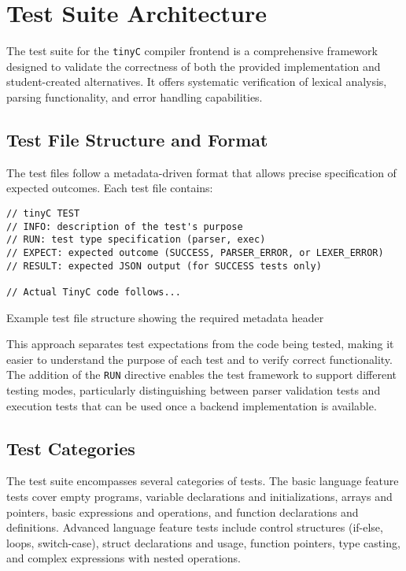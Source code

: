 \pagebreak







\section{Test Suite Architecture}
The test suite for the \texttt{tinyC} compiler frontend is a comprehensive framework designed to validate the correctness of both the provided implementation and student-created alternatives. It offers systematic verification of lexical analysis, parsing functionality, and error handling capabilities.

\subsection{Test File Structure and Format}
The test files follow a metadata-driven format that allows precise specification of expected outcomes. Each test file contains:

\begin{listing}[h!]
\begin{verbatim}
// tinyC TEST
// INFO: description of the test's purpose
// RUN: test type specification (parser, exec)
// EXPECT: expected outcome (SUCCESS, PARSER_ERROR, or LEXER_ERROR)
// RESULT: expected JSON output (for SUCCESS tests only)

// Actual TinyC code follows...
\end{verbatim}
\caption{Example test file structure showing the required metadata header}
\label{code:test-file-structure}
\end{listing}

This approach separates test expectations from the code being tested, making it easier to understand the purpose of each test and to verify correct functionality. The addition of the \texttt{RUN} directive enables the test framework to support different testing modes, particularly distinguishing between parser validation tests and execution tests that can be used once a backend implementation is available.

\subsection{Test Categories}
The test suite encompasses several categories of tests. The basic language feature tests cover empty programs, variable declarations and initializations, arrays and pointers, basic expressions and operations, and function declarations and definitions. Advanced language feature tests include control structures (if-else, loops, switch-case), struct declarations and usage, function pointers, type casting, and complex expressions with nested operations.

